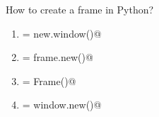 \question
How to create a frame in Python?

\begin{enumerate}
\item \lstinline@Frame = new.window()@
\item \lstinline@Frame = frame.new()@
\item \lstinline@Frame = Frame()@
\item \lstinline@Frame = window.new()@
\end{enumerate}

